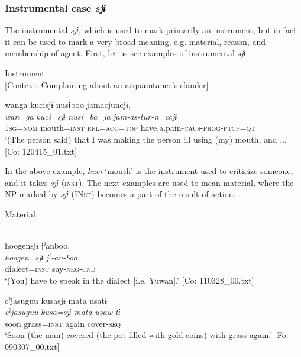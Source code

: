 \subsubsection{Instrumental case \textit{sjɨ}}

The instrumental \textit{sjɨ}, which is used to mark primarily an instrument, but in fact it can be used to mark a very broad meaning, e.g. material, reason, and membership of agent. First, let us see examples of instrumental \textit{sjɨ}.

\ea\label{ex:6-68}
 Instrument\\{}
[Context: Complaining about an acquaintance’s slander]

{\TM}
\glll wanga  kucisjɨ  nusiboo  jamacjuncjɨ,\\
\textit{wan=ga}  \textit{kuci=sjɨ}  \textit{nusi=ba=ja}  \textit{jam-as-tur-n=ccjɨ}\\
    1\textsc{sg}=\textsc{nom}  mouth=\textsc{inst}  \textsc{rfl}=\textsc{acc}=\textsc{top}  have.a.pain-\textsc{caus}-\textsc{prog}-\textsc{ptcp}=\textsc{qt}\\
\glt    ‘(The person\textit{\textsubscript{} }said) that I was making the person ill using (my) mouth, and ...’ [Co: 120415\_01.txt]
\z

In the above example, \textit{kuci} ‘mouth’ is the instrument used to criticize someone, and it takes \textit{sjɨ} (\textsc{inst}). The next examples are used to mean material, where the NP marked by \textit{sjɨ} (IN\textsc{st}) becomes a part of the result of action.

\ea\label{ex:6-69}
  Material

 \ea{}\\
{\TM}
\glll  {\textbar}hoogen{\textbar}sjɨ  jˀanboo.\\
\textit{hoogen=sjɨ}  \textit{jˀ-an-boo}\\
dialect=\textsc{inst}  say-\textsc{neg}-\textsc{cnd}\\
\glt ‘(You) have to speak in the dialect [i.e. Yuwan].’ [Co: 110328\_00.txt]
\z

\ex {\TM}  cˀjasuguu  kusasjɨ  mata  usatɨ\\
\glll \textit{cˀjasuguu}  \textit{kusa=sjɨ}  \textit{mata}  \textit{usaw-tɨ}\\
soon  grass=\textsc{inst}  again  cover-\textsc{seq}\\
\glt ‘Soon (the man) covered (the pot filled with gold coins) with grass again.’ [Fo: 090307\_00.txt]
\z

